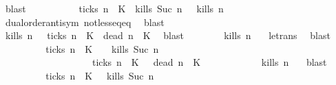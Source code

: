\begin{isabellebody}
\ blast\isanewline
\ \ \ \ \ \ \isamarkupfalse%
\ \isamarkupfalse%
\ {\isacartoucheopen}{\isacharparenleft}{\isacharparenleft}{\isasymnot}\ {\isacharquery}ticks\ n\ {\isasymrho}\ K\ {\isasymand}\ {\isacharparenleft}{\isacharquery}kills\ {\isacharparenleft}Suc\ n{\isacharparenright}\ {\isasymrho}{\isacharparenright}{\isacharparenright}\ {\isasymlongrightarrow}\ {\isacharquery}kills\ n\ {\isasymrho}{\isacartoucheclose}\isanewline
\ \ \ \ \ \ \ \ \isamarkupfalse%
\ dual{\isacharunderscore}order{\isachardot}antisym\ not{\isacharunderscore}less{\isacharunderscore}eq{\isacharunderscore}eq\ \isamarkupfalse%
\ blast\isanewline
\ \ \ \ \ \ \isamarkupfalse%
\ \isamarkupfalse%
\ {\isacartoucheopen}{\isacharquery}kills\ n\ {\isasymrho}\ {\isasymor}\ {\isacharquery}ticks\ n\ {\isasymrho}\ K\ {\isasymand}\ {\isacharquery}dead\ n\ {\isasymrho}\ K\ \isamarkupfalse%
\ blast\isanewline
\ \ \ \ \ \ \isamarkupfalse%
\ {\isacartoucheopen}{\isacharquery}kills\ n\ {\isasymrho}{\isacartoucheclose}\ \isamarkupfalse%
\ le{\isacharunderscore}trans\ \isamarkupfalse%
\ blast\isanewline
\ \ \ \ \isacommand{{\isacharbraceright}}\isamarkupfalse%
\ \isamarkupfalse%
\ {\isacartoucheopen}{\isacharparenleft}{\isacharbraceleft}{\isasymrho}{\isachardot}\ {\isasymnot}\ {\isacharquery}ticks\ n\ {\isasymrho}\ K\ \ {\isasyminter}\ {\isacharbraceleft}{\isasymrho}{\isachardot}\ {\isacharquery}kills\ {\isacharparenleft}Suc\ n{\isacharparenright}\ {\isasymrho}{\isacharbraceright}{\isacharparenright}\isanewline
\ \ \ \ \ \ \ \ \ \ \ \ \ \ \ \ \ {\isasymunion}\ {\isacharparenleft}{\isacharbraceleft}{\isasymrho}{\isachardot}\ {\isacharquery}ticks\ n\ {\isasymrho}\ K\ {\isasyminter}\ {\isacharbraceleft}{\isasymrho}{\isachardot}\ {\isacharquery}dead\ n\ {\isasymrho}\ K\isanewline
\ \ \ \ \ \ \ \ \ \ {\isasymsubseteq}\ {\isacharbraceleft}{\isasymrho}{\isachardot}\ {\isacharquery}kills\ n\ {\isasymrho}{\isacharbraceright}{\isacartoucheclose}\ \isamarkupfalse%
\ blast\isanewline
\ \ \isamarkupfalse%
\isanewline
\ \ \isamarkupfalse%
\ \isamarkupfalse%
\ {\isacartoucheopen}{\isachardot}{\isachardot}{\isachardot}\ {\isacharequal}\ {\isacharbraceleft}{\isasymrho}{\isachardot}\ {\isasymnot}\ {\isacharquery}ticks\ n\ {\isasymrho}\ K\ {\isasyminter}\ {\isacharbraceleft}{\isasymrho}{\isachardot}\ {\isacharquery}kills\ {\isacharparenleft}Suc\ n{\isacharparenright}\ {\isasymrho}{\isacharbraceright}\isanewline

\end{isabellebody}
